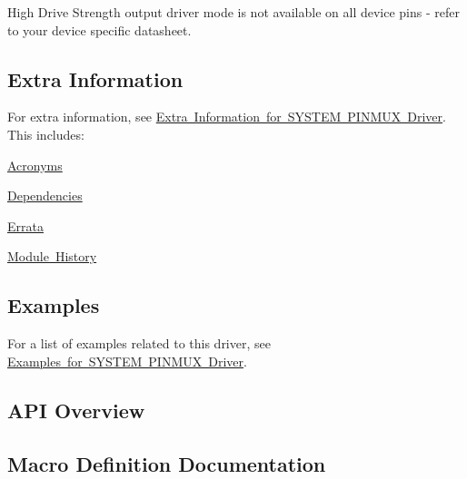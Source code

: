 High Drive Strength output driver mode is not available on all device pins -\/ refer to your device specific datasheet.\hypertarget{group__asfdoc__sam0__system__pinmux__group_asfdoc_sam0_system_pinmux_extra_info}{}\subsection{Extra Information}\label{group__asfdoc__sam0__system__pinmux__group_asfdoc_sam0_system_pinmux_extra_info}
For extra information, see \mbox{\hyperlink{asfdoc_sam0_system_pinmux_extra}{Extra Information for S\+Y\+S\+T\+EM P\+I\+N\+M\+UX Driver}}. This includes\+:
\begin{DoxyItemize}
\item \mbox{\hyperlink{asfdoc_sam0_system_pinmux_extra_asfdoc_sam0_system_pinmux_extra_acronyms}{Acronyms}}
\item \mbox{\hyperlink{asfdoc_sam0_system_pinmux_extra_asfdoc_sam0_system_pinmux_extra_dependencies}{Dependencies}}
\item \mbox{\hyperlink{asfdoc_sam0_system_pinmux_extra_asfdoc_sam0_system_pinmux_extra_errata}{Errata}}
\item \mbox{\hyperlink{asfdoc_sam0_system_pinmux_extra_asfdoc_sam0_system_pinmux_extra_history}{Module History}}
\end{DoxyItemize}\hypertarget{group__asfdoc__sam0__system__pinmux__group_asfdoc_sam0_system_pinmux_examples}{}\subsection{Examples}\label{group__asfdoc__sam0__system__pinmux__group_asfdoc_sam0_system_pinmux_examples}
For a list of examples related to this driver, see \mbox{\hyperlink{asfdoc_sam0_system_pinmux_exqsg}{Examples for S\+Y\+S\+T\+EM P\+I\+N\+M\+UX Driver}}.\hypertarget{group__asfdoc__sam0__system__pinmux__group_asfdoc_sam0_system_pinmux_api_overview}{}\subsection{A\+P\+I Overview}\label{group__asfdoc__sam0__system__pinmux__group_asfdoc_sam0_system_pinmux_api_overview}


\subsection{Macro Definition Documentation}
\mbox{\label{group__asfdoc__sam0__system__pinmux__group_gaf212e7bc2a29cb57ab7b1130e4404a6b}} 
